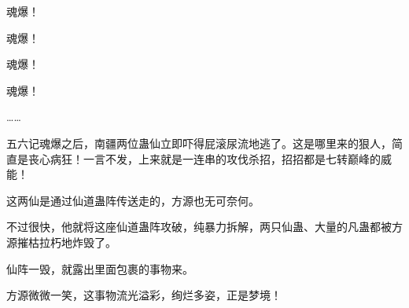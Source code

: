 \begin{this_body}
魂爆！

魂爆！

魂爆！

魂爆！

……

五六记魂爆之后，南疆两位蛊仙立即吓得屁滚尿流地逃了。这是哪里来的狠人，简直是丧心病狂！一言不发，上来就是一连串的攻伐杀招，招招都是七转巅峰的威能！

这两仙是通过仙道蛊阵传送走的，方源也无可奈何。

不过很快，他就将这座仙道蛊阵攻破，纯暴力拆解，两只仙蛊、大量的凡蛊都被方源摧枯拉朽地炸毁了。

仙阵一毁，就露出里面包裹的事物来。

方源微微一笑，这事物流光溢彩，绚烂多姿，正是梦境！

\end{this_body}

